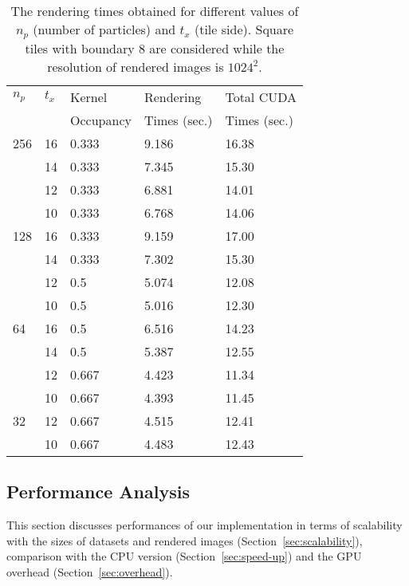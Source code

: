 \documentclass[1p]{elsarticle}
\begin{document}
\begin{table}
\label{tab:tuning}
\begin{center}
\begin{tabular}{|l|l|l|l|l|}
\hline
$n_p$ & $t_x$ & Kernel & Rendering & Total CUDA \\
& & Occupancy & Times (sec.) & Times (sec.) \\
\hline
256   & 16 & 0.333 & 9.186 & 16.38 \\
\hline
      & 14 & 0.333 & 7.345  & 15.30 \\
\hline
      & 12 & 0.333 & 6.881  & 14.01 \\
\hline
      & 10 & 0.333 & 6.768 & 14.06 \\
\hline
128   & 16 & 0.333 & 9.159 & 17.00 \\
\hline
      & 14 & 0.333 & 7.302  & 15.30 \\
\hline
      & 12 & 0.5 & 5.074  & 12.08 \\
\hline
      & 10 & 0.5 & 5.016 & 12.30 \\ 
\hline
64    & 16 & 0.5 & 6.516 & 14.23 \\
\hline
      & 14 & 0.5 & 5.387 & 12.55 \\
\hline
      & 12 & 0.667 & 4.423 & 11.34 \\
\hline
      & 10 & 0.667 & 4.393 & 11.45 \\ 
\hline
32    & 12 & 0.667 & 4.515 & 12.41 \\
\hline
      & 10 & 0.667 & 4.483 & 12.43 \\ 
\hline
\end{tabular}
\caption{The rendering times obtained for different values of $n_p$ (number of particles) and $t_x$ (tile side). Square tiles with boundary 8 are considered while the resolution of rendered images is $1024^{2}.$}
\end{center}
\end{table}

\subsection{Performance Analysis}
\label{sec:performance}
This section discusses performances of our implementation in terms of scalability with the sizes of datasets and rendered images (Section~\ref{sec:scalability}), comparison with the CPU version (Section~\ref{sec:speed-up}) and the GPU overhead (Section~\ref{sec:overhead}).
\end{document}
